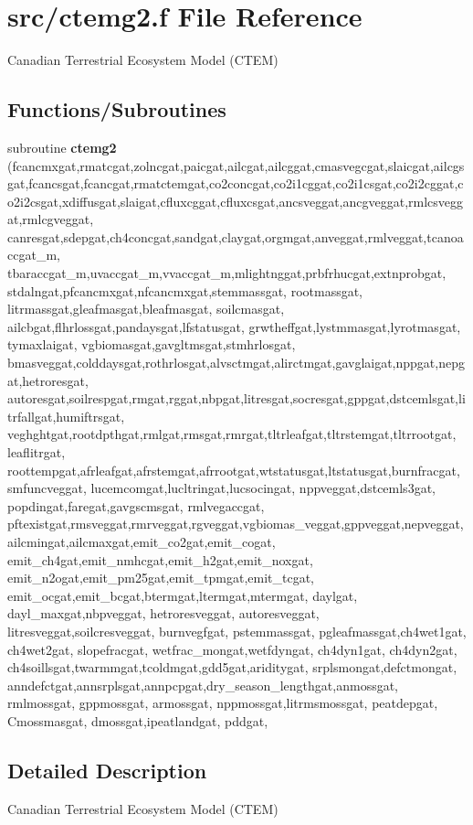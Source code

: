 \hypertarget{ctemg2_8f}{}\section{src/ctemg2.f File Reference}
\label{ctemg2_8f}


Canadian Terrestrial Ecosystem Model (C\+T\+E\+M)  


\subsection*{Functions/\+Subroutines}
\begin{DoxyCompactItemize}
\item 
\hypertarget{ctemg2_8f_ac3b8f34561a13007060d16f1995e4dde}{}subroutine {\bfseries ctemg2} (fcancmxgat,rmatcgat,zolncgat,paicgat,ailcgat,ailcggat,cmasvegcgat,slaicgat,ailcgsgat,fcancsgat,fcancgat,rmatctemgat,co2concgat,co2i1cggat,co2i1csgat,co2i2cggat,co2i2csgat,xdiffusgat,slaigat,cfluxcggat,cfluxcsgat,ancsveggat,ancgveggat,rmlcsveggat,rmlcgveggat, canresgat,sdepgat,ch4concgat,sandgat,claygat,orgmgat,anveggat,rmlveggat,tcanoaccgat\+\_\+m, tbaraccgat\+\_\+m,uvaccgat\+\_\+m,vvaccgat\+\_\+m,mlightnggat,prbfrhucgat,extnprobgat, stdalngat,pfcancmxgat,nfcancmxgat,stemmassgat, rootmassgat, litrmassgat,gleafmasgat,bleafmasgat, soilcmasgat, ailcbgat,flhrlossgat,pandaysgat,lfstatusgat, grwtheffgat,lystmmasgat,lyrotmasgat, tymaxlaigat, vgbiomasgat,gavgltmsgat,stmhrlosgat, bmasveggat,colddaysgat,rothrlosgat,alvsctmgat,alirctmgat,gavglaigat,nppgat,nepgat,hetroresgat, autoresgat,soilrespgat,rmgat,rggat,nbpgat,litresgat,socresgat,gppgat,dstcemlsgat,litrfallgat,humiftrsgat, veghghtgat,rootdpthgat,rmlgat,rmsgat,rmrgat,tltrleafgat,tltrstemgat,tltrrootgat, leaflitrgat, roottempgat,afrleafgat,afrstemgat,afrrootgat,wtstatusgat,ltstatusgat,burnfracgat, smfuncveggat, lucemcomgat,lucltringat,lucsocingat, nppveggat,dstcemls3gat, popdingat,faregat,gavgscmsgat, rmlvegaccgat, pftexistgat,rmsveggat,rmrveggat,rgveggat,vgbiomas\+\_\+veggat,gppveggat,nepveggat,ailcmingat,ailcmaxgat,emit\+\_\+co2gat,emit\+\_\+cogat, emit\+\_\+ch4gat,emit\+\_\+nmhcgat,emit\+\_\+h2gat,emit\+\_\+noxgat, emit\+\_\+n2ogat,emit\+\_\+pm25gat,emit\+\_\+tpmgat,emit\+\_\+tcgat, emit\+\_\+ocgat,emit\+\_\+bcgat,btermgat,ltermgat,mtermgat, daylgat, dayl\+\_\+maxgat,nbpveggat, hetroresveggat, autoresveggat, litresveggat,soilcresveggat, burnvegfgat, pstemmassgat, pgleafmassgat,ch4wet1gat, ch4wet2gat, slopefracgat, wetfrac\+\_\+mongat,wetfdyngat, ch4dyn1gat, ch4dyn2gat, ch4soillsgat,twarmmgat,tcoldmgat,gdd5gat,ariditygat, srplsmongat,defctmongat, anndefctgat,annsrplsgat,annpcpgat,dry\+\_\+season\+\_\+lengthgat,anmossgat, rmlmossgat, gppmossgat, armossgat, nppmossgat,litrmsmossgat, peatdepgat, Cmossmasgat, dmossgat,ipeatlandgat, pddgat,\label{ctemg2_8f_ac3b8f34561a13007060d16f1995e4dde}

\end{DoxyCompactItemize}


\subsection{Detailed Description}
Canadian Terrestrial Ecosystem Model (C\+T\+E\+M) 

